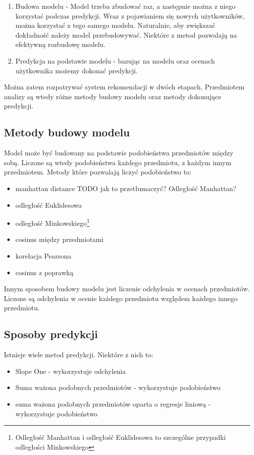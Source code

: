 \documentclass[12pt, a4paper]{article}
\begin{document}
\begin{enumerate}
\item Budowa modelu - Model trzeba zbudować raz, a następnie można z niego korzystać podczas predykcji. Wraz z pojawianiem się nowych użytkowników, można korzystać z tego samego modelu. Naturalnie, aby zwiększać dokładność należy model przebudowywać. Niektóre z metod pozwalają na efektywną rozbudowę modelu.
\item Predykcja na podstawie modelu - bazując na modelu oraz ocenach użytkownika możemy dokonać predykcji.
\end{enumerate} 

Można zatem rozpatrywać system rekomendacji w dwóch etapach. Przedmiotem analizy są wtedy różne metody budowy modelu oraz metody dokonujące predykcji.

\subsection{Metody budowy modelu}
Model może być budowany na podstawie podobieństwa przedmiotów między sobą. Liczone są wtedy podobieństwa każdego przedmiotu, z każdym innym przedmiotem. Metody które pozwalają liczyć podobieństwo to:
\begin{itemize}
\item manhattan distance TODO jak to przetłumaczyć? Odległość Manhattan?
\item odległość Euklidesowa
\item odległość Minkowskiego\footnote{Odległość Manhattan i odległość Euklidesowa to szczególne przypadki odległości Minkowskiego}
\item cosinus między przedmiotami
\item korelacja Pearsona
\item cosinus z poprawką
\end{itemize}

Innym sposobem budowy modelu jest liczenie odchylenia w ocenach przedmiotów. Liczone są odchylenia w ocenie każdego przedmiotu względem każdego innego przedmiotu.

\subsection{Sposoby predykcji}
Istnieje wiele metod predykcji. Niektóre z nich to:

\begin{itemize}
\item Slope One - wykorzystuje odchylenia
\item Suma ważona podobnych przedmiotów - wykorzystuje podobieństwo
\item suma ważona podobnych przedmiotów oparta o regresje liniową - wykorzystuje podobieństwo
\end{itemize}
\end{document}
